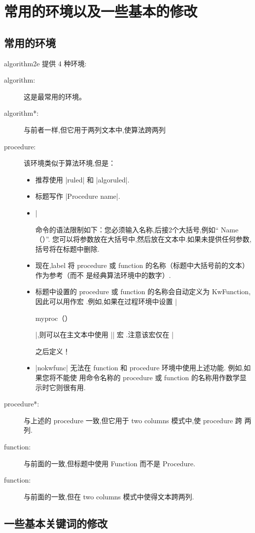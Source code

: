 \section{常用的环境以及一些基本的修改}

\subsection{常用的环境}

\noindent \textcolor{pack}{algorithm2e} 提供 4 种环境:
\begin{description}
	\item[algorithm:] 这是最常用的环境。
	\item[algorithm*:]  与前者一样,但它用于两列文本中,使算法跨两列
	\item[procedure:]该环境类似于算法环境,但是：
	\begin{itemize}
		\item 推荐使用 |ruled| 和 |algoruled|.
		\item 标题写作 |Procedure name|.
		\item |\caption| 命令的语法限制如下：您必须输入名称,后接2个大括号,例如“ Name（）”.
		您可以将参数放在大括号中,然后放在文本中.如果未提供任何参数,括号将在标题中删除.
		\item 现在,label 将 procedure 或 function 的名称（标题中大括号前的文本）作为参考（而不
		是经典算法环境中的数字）.
		\item 标题中设置的 procedure 或 function 的名称会自动定义为 KwFunction,因此可以用作宏
		.例如,如果在过程环境中设置 |\caption{myproc（）}|,则可以在主文本中使用 |\myproc| 宏
		.注意该宏仅在 |\caption| 之后定义！
		\item |nokwfunc| 无法在 function 和 procedure 环境中使用上述功能. 例如,如果您将不能使
		用命令名称的 procedure 或 function 的名称用作数学显示时它则很有用.
	\end{itemize}
	\item[procedure*:] 与上述的 procedure 一致,但它用于 two columns 模式中,使 procedure 跨
	两列.
	\item [function:]  与前面的一致,但标题中使用 Function 而不是 Procedure.
	\item [function:] 与前面的一致,但在 two columns 模式中使得文本跨两列.
\end{description}

\subsection{一些基本关键词的修改}

